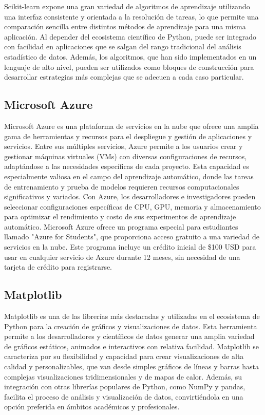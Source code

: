 Scikit-learn expone una gran variedad de algoritmos de aprendizaje utilizando una interfaz consistente y orientada a la resolución de tareas, lo que permite una comparación sencilla entre distintos métodos de aprendizaje para una misma aplicación. Al depender del ecosistema científico de Python, puede ser integrado con facilidad en aplicaciones que se salgan del rango tradicional del análisis estadístico de datos. Además, los algoritmos, que han sido implementados en un lenguaje de alto nivel, pueden ser utilizados como bloques de construcción para desarrollar estrategias más complejas que se adecuen a cada caso particular.

\subsection{Microsoft Azure}
\label{subsec:azure}

Microsoft Azure es una plataforma de servicios en la nube que ofrece una amplia gama de herramientas y recursos para el despliegue y gestión de aplicaciones y servicios. Entre sus múltiples servicios, Azure permite a los usuarios crear y gestionar máquinas virtuales (VMs) con diversas configuraciones de recursos, adaptándose a las necesidades específicas de cada proyecto. Esta capacidad es especialmente valiosa en el campo del aprendizaje automático, donde las tareas de entrenamiento y prueba de modelos requieren recursos computacionales significativos y variados. Con Azure, los desarrolladores e investigadores pueden seleccionar configuraciones específicas de CPU, GPU, memoria y almacenamiento para optimizar el rendimiento y costo de sus experimentos de aprendizaje automático. Microsoft Azure ofrece un programa especial para estudiantes llamado "Azure for Students", que proporciona acceso gratuito a una variedad de servicios en la nube. Este programa incluye un crédito inicial de \$100 USD para usar en cualquier servicio de Azure durante 12 meses, sin necesidad de una tarjeta de crédito para registrarse. 

\subsection{Matplotlib}
\label{subsec:matplotlib}

Matplotlib es una de las librerías más destacadas y utilizadas en el ecosistema de Python para la creación de gráficos y visualizaciones de datos. Esta herramienta permite a los desarrolladores y científicos de datos generar una amplia variedad de gráficos estáticos, animados e interactivos con relativa facilidad. Matplotlib se caracteriza por su flexibilidad y capacidad para crear visualizaciones de alta calidad y personalizables, que van desde simples gráficos de líneas y barras hasta complejas visualizaciones tridimensionales y de mapas de calor. Además, su integración con otras librerías populares de Python, como NumPy y pandas, facilita el proceso de análisis y visualización de datos, convirtiéndola en una opción preferida en ámbitos académicos y profesionales.

